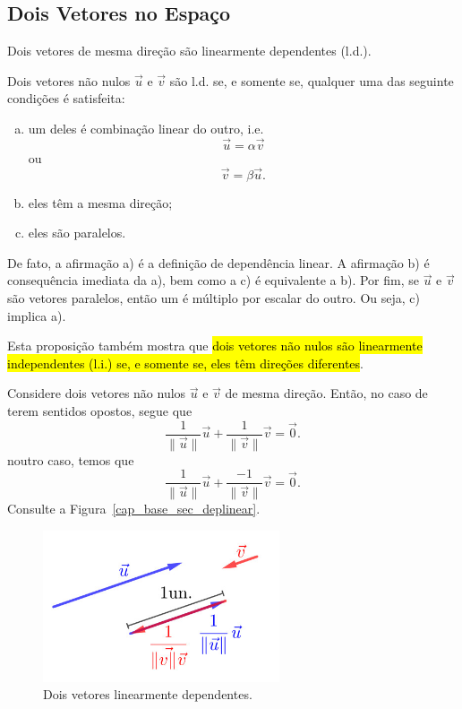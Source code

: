 \subsection{Dois Vetores no Espaço}

Dois vetores de mesma direção são linearmente dependentes (l.d.). 

\begin{proposicao}
  Dois vetores não nulos $\vec{u}$ e $\vec{v}$ são l.d. se, e somente se, qualquer uma das seguinte condições é satisfeita:
  \begin{enumerate}[a)]
  \item um deles é combinação linear do outro, i.e.
    \begin{equation}
      \vec{u} = \alpha\vec{v}
    \end{equation}
    ou
    \begin{equation}
      \vec{v}=\beta\vec{u}.
    \end{equation}
  \item eles têm a mesma direção;
  \item eles são paralelos.
  \end{enumerate}
\end{proposicao}
\begin{demonstracao}
  De fato, a afirmação a) é a definição de dependência linear. A afirmação b) é consequência imediata da a), bem como a c) é equivalente a b). Por fim, se $\vec{u}$ e $\vec{v}$ são vetores paralelos, então um é múltiplo por escalar do outro. Ou seja, c) implica a).  
\end{demonstracao}

Esta proposição também mostra que \hl{dois vetores não nulos são linearmente independentes (l.i.) se, e somente se, eles têm direções diferentes}.

\begin{ex}
  Considere dois vetores não nulos $\vec{u}$ e $\vec{v}$ de mesma direção. Então, no caso de terem sentidos opostos, segue que
  \begin{equation}
    \frac{1}{\|\vec{u}\|}\vec{u} + \frac{1}{\|\vec{v}\|}\vec{v} = \vec{0}.
  \end{equation}
  noutro caso, temos que
  \begin{equation}
    \frac{1}{\|\vec{u}\|}\vec{u} + \frac{-1}{\|\vec{v}\|}\vec{v} = \vec{0}.
  \end{equation}
  Consulte a Figura~\ref{cap_base_sec_deplinear}.

  \begin{figure}[h]
    \centering
    \includegraphics[width=2.75in]{./cap_base/dados/fig_dois_vetores_dependentes/fig.jpg}
    \caption{Dois vetores linearmente dependentes.}
  \end{figure}
\end{ex}

